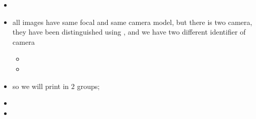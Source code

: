 \documentclass[a4paper]{article}
\begin{document}
\begin{itemize}
    \item {}
    \item all images have same focal and same camera model, but there is two
          camera, they have been  distinguished  using ,
          and we have two different identifier of camera  

    \begin{itemize}
             \item {}
             \item {}
    \end{itemize}

     \item so we will print in $2$ groups;
\end{itemize}






\SecRelatedCmd

\begin{itemize}
   \item  {}
   \item  {}
\end{itemize}

\end{document}

